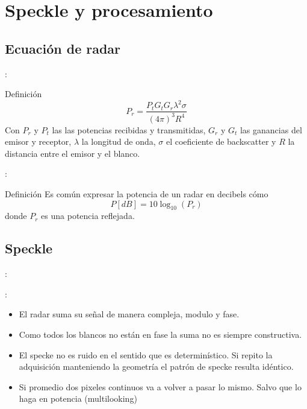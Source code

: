 \section{Speckle y procesamiento}

\subsection{Ecuación de radar}
\begin{frame}{\secname : \subsecname}
    \begin{block}{Definición}
      \begin{equation}
        P_r = \frac{P_t G_t G_r \lambda^2 \sigma}{(4\pi)^3 R^4}
      \end{equation}
      Con $P_r$ y $P_t$ las las potencias recibidas y transmitidas, $G_r$ y $G_t$ las ganancias del emisor y receptor, $\lambda$ la longitud de onda, $\sigma$ el coeficiente de backscatter y $R$ la distancia entre el emisor y el blanco.
    \end{block}
\end{frame}

\begin{frame}{\secname : \subsecname}
    \begin{block}{Definición}
      Es común expresar la potencia de un radar en decibels cómo
      \begin{equation}
        P [dB] = 10\log_{10}(P_r)
      \end{equation}
      donde $P_r$ es una potencia reflejada.
    \end{block}
\end{frame}

\subsection{Speckle}
\begin{frame}{\secname : \subsecname}
  \begin{figure}
    \centering
    \caption{ }
    \label{}
  \end{figure}
\end{frame}

\begin{frame}{\secname : \subsecname}
  \begin{itemize}
    \item El radar suma su señal de manera compleja, modulo y fase.
    \item Como todos los blancos no están en fase la suma no es siempre constructiva.
    \item El specke no es ruido en el sentido que es determinístico. Si repito la adquisición manteniendo la geometría el patrón de specke resulta idéntico.
    \item Si promedio dos pixeles continuos va a volver a pasar lo mismo. Salvo que lo haga en potencia (multilooking)
  \end{itemize}
\end{frame}

